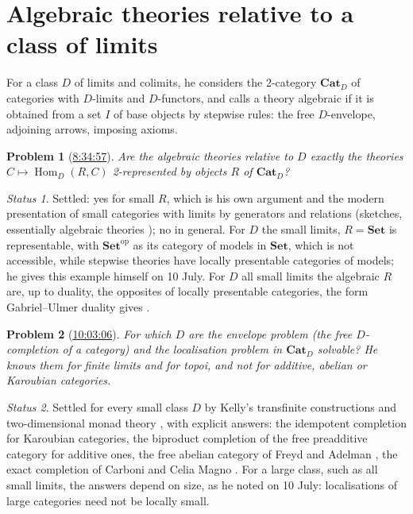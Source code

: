 \documentclass[11pt,a4paper]{amsart}
\newtheorem{problem}{Problem}
\theoremstyle{definition}
\theoremstyle{remark}
\newtheorem*{status}{Status}
\newcommand{\ts}[3]{\href{https://www.youtube.com/watch?v=#1&t=#2}{#3}}
\newcommand{\Set}{\mathbf{Set}}
\newcommand{\Cat}{\mathbf{Cat}}
\begin{document}
\section{Algebraic theories relative to a class of limits}

For a class $D$ of limits and colimits, he considers the 2-category $\Cat_D$ of categories with $D$-limits and $D$-functors, and calls a theory algebraic if it is obtained from a set $I$ of base objects by stepwise rules: the free $D$-envelope, adjoining arrows, imposing axioms.

\begin{problem}[\ts{PqCQM3Pcl6Q}{8h34m57s}{8:34:57}]\label{p:representable}
Are the algebraic theories relative to $D$ exactly the theories $C\mapsto \operatorname{Hom}_D(R,C)$ 2-represented by objects $R$ of $\Cat_D$?
\end{problem}
\begin{status}
Settled: yes for small $R$, which is his own argument and the modern presentation of small categories with limits by generators and relations (sketches, essentially algebraic theories \cite[ch.~3]{ar}); no in general. For $D$ the small limits, $R=\Set$ is representable, with $\Set^{\mathrm{op}}$ as its category of models in $\Set$, which is not accessible, while stepwise theories have locally presentable categories of models; he gives this example himself on 10 July. For $D$ all small limits the algebraic $R$ are, up to duality, the opposites of locally presentable categories, the form Gabriel--Ulmer duality gives \cite{gu}.
\end{status}

\begin{problem}[\ts{PqCQM3Pcl6Q}{10h3m6s}{10:03:06}]\label{p:envelope}
For which $D$ are the envelope problem (the free $D$-completion of a category) and the localisation problem in $\Cat_D$ solvable? He knows them for finite limits and for topoi, and not for additive, abelian or Karoubian categories.
\end{problem}
\begin{status}
Settled for every small class $D$ by Kelly's transfinite constructions and two-dimensional monad theory \cite{kelly, bkp}, with explicit answers: the idempotent completion for Karoubian categories, the biproduct completion of the free preadditive category for additive ones, the free abelian category of Freyd and Adelman \cite{freyd, adelman}, the exact completion of Carboni and Celia Magno \cite{ccm}. For a large class, such as all small limits, the answers depend on size, as he noted on 10 July: localisations of large categories need not be locally small.
\end{status}
\end{document}
